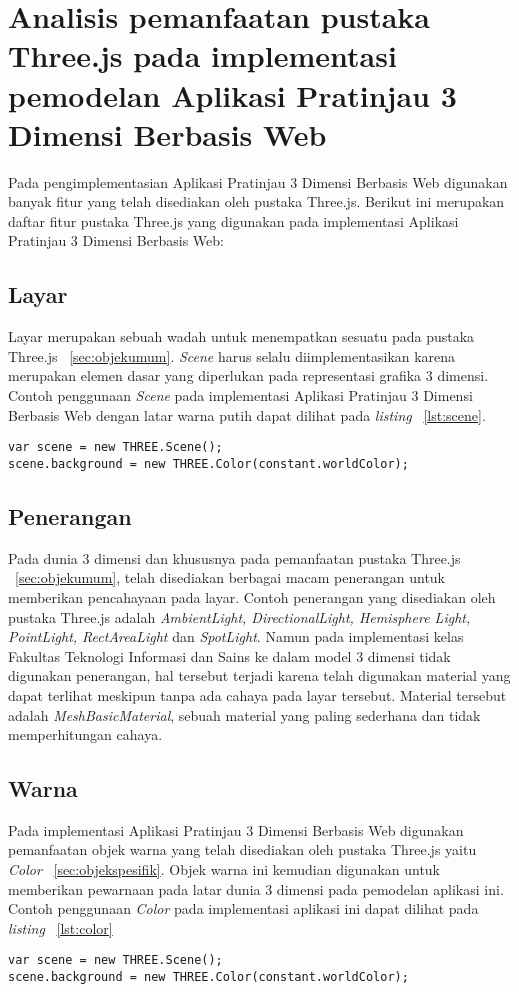 \section{Analisis pemanfaatan pustaka Three.js pada implementasi pemodelan Aplikasi Pratinjau 3 Dimensi Berbasis Web}
\label{sec:pemanfaatanthreejs}
Pada pengimplementasian Aplikasi Pratinjau 3 Dimensi Berbasis Web digunakan banyak fitur yang telah disediakan oleh pustaka Three.js. Berikut ini merupakan daftar fitur pustaka Three.js yang digunakan pada implementasi Aplikasi Pratinjau 3 Dimensi Berbasis Web:

\subsection{Layar}
Layar merupakan sebuah wadah untuk menempatkan sesuatu pada pustaka Three.js ~\ref{sec:objekumum}. {\it Scene} harus selalu diimplementasikan karena merupakan elemen dasar yang diperlukan pada representasi grafika 3 dimensi. Contoh penggunaan {\it Scene} pada implementasi Aplikasi Pratinjau 3 Dimensi Berbasis Web dengan latar warna putih dapat dilihat pada {\it listing} ~\ref{lst:scene}.
\begin{lstlisting}[caption={Contoh penggunaan {\it Scene}}, label={lst:scene},captionpos=b]
var scene = new THREE.Scene();
scene.background = new THREE.Color(constant.worldColor);
\end{lstlisting}

\subsection{Penerangan}
Pada dunia 3 dimensi dan khususnya pada pemanfaatan pustaka Three.js ~\ref{sec:objekumum}, telah disediakan berbagai macam penerangan untuk memberikan pencahayaan pada layar. Contoh penerangan yang disediakan oleh pustaka Three.js adalah {\it AmbientLight, DirectionalLight, Hemisphere Light, PointLight, RectAreaLight} dan {\it SpotLight}. Namun pada implementasi kelas Fakultas Teknologi Informasi dan Sains ke dalam model 3 dimensi tidak digunakan penerangan, hal tersebut terjadi karena telah digunakan material yang dapat terlihat meskipun tanpa ada cahaya pada layar tersebut. Material tersebut adalah {\it MeshBasicMaterial}, sebuah material yang paling sederhana dan tidak memperhitungan cahaya.

\subsection{Warna}
Pada implementasi Aplikasi Pratinjau 3 Dimensi Berbasis Web digunakan pemanfaatan objek warna yang telah disediakan oleh pustaka Three.js yaitu {\it Color} ~\ref{sec:objekspesifik}. Objek warna ini kemudian digunakan untuk memberikan pewarnaan pada latar dunia 3 dimensi pada pemodelan aplikasi ini. Contoh penggunaan {\it Color} pada implementasi aplikasi ini dapat dilihat pada {\it listing} ~\ref{lst:color}
\begin{lstlisting}[caption={Contoh penggunaan {\it Color}}, label={lst:color},captionpos=b]
var scene = new THREE.Scene();
scene.background = new THREE.Color(constant.worldColor);
\end{lstlisting}

